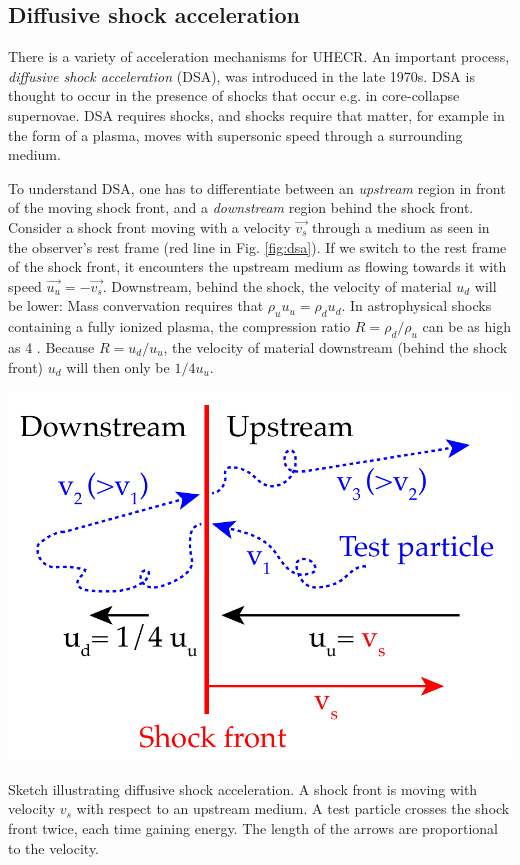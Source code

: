 \documentclass[
    a4paper, %
    fontsize=10pt, %
    twoside=false, %
    numbers=noenddot, %
    fontmethod=tex,
]{kaobook}
\begin{document}
\subsection{Diffusive shock acceleration} \label{dsa}
There is a variety of acceleration mechanisms for UHECR. An important process, \textit{diffusive shock acceleration} (DSA), was introduced in the late 1970s. DSA is thought to occur in the presence of shocks that occur e.g. in core-collapse supernovae. DSA requires shocks, and shocks require that matter, for example in the form of a plasma, moves with supersonic speed through a surrounding medium.

To understand DSA, one has to differentiate between an \textit{upstream} region in front of the moving shock front, and a \textit{downstream} region behind the shock front. Consider a shock front moving with a velocity $\vec{v_s}$ through a medium as seen in the observer's rest frame (red line in Fig. \ref{fig:dsa}). If we switch to the rest frame of the shock front, it encounters the upstream medium as flowing towards it with speed $\vec{u_u}=-\vec{v_s}$. Downstream, behind the shock, the velocity of material $u_d$ will be lower: Mass convervation requires that $\rho_u u_u = \rho_d u_d$. In astrophysical shocks containing a fully ionized plasma, the compression ratio $R=\rho_d/\rho_u$ can be as high as 4 . Because $R=u_d/u_u$, the velocity of material downstream (behind the shock front) $u_d$ will then only be $1/4 u_u$.

\begin{marginfigure}
    \includegraphics{theory/dsa.pdf}
    \caption[Diffusive shock acceleration]{Sketch illustrating diffusive shock acceleration. A shock front is moving with velocity $v_s$ with respect to an upstream medium. A test particle crosses the shock front twice, each time gaining energy. The length of the arrows are proportional to the velocity.}
\end{marginfigure}
\end{document}
